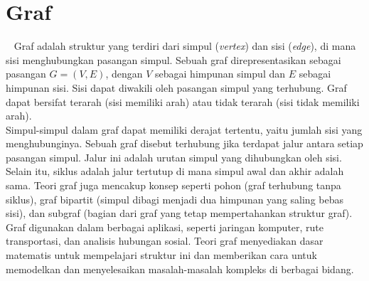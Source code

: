 \section{Graf}
\label{sec:graph}
~\cite{Diestel:17:graph}
Graf adalah struktur yang terdiri dari simpul (\textit{vertex}) dan sisi (\textit{edge}), di mana sisi menghubungkan pasangan simpul. Sebuah graf direpresentasikan sebagai pasangan $G=(V,E)$, dengan $V$ sebagai himpunan simpul dan $E$ sebagai himpunan sisi. Sisi dapat diwakili oleh pasangan simpul yang terhubung. Graf dapat bersifat terarah (sisi memiliki arah) atau tidak terarah (sisi tidak memiliki arah).
\\
Simpul-simpul dalam graf dapat memiliki derajat tertentu, yaitu jumlah sisi yang menghubunginya. Sebuah graf disebut terhubung jika terdapat jalur antara setiap pasangan simpul. Jalur ini adalah urutan simpul yang dihubungkan oleh sisi. Selain itu, siklus adalah jalur tertutup di mana simpul awal dan akhir adalah sama. Teori graf juga mencakup konsep seperti pohon (graf terhubung tanpa siklus), graf bipartit (simpul dibagi menjadi dua himpunan yang saling bebas sisi), dan subgraf (bagian dari graf yang tetap mempertahankan struktur graf).
\\
Graf digunakan dalam berbagai aplikasi, seperti jaringan komputer, rute transportasi, dan analisis hubungan sosial. Teori graf menyediakan dasar matematis untuk mempelajari struktur ini dan memberikan cara untuk memodelkan dan menyelesaikan masalah-masalah kompleks di berbagai bidang.

